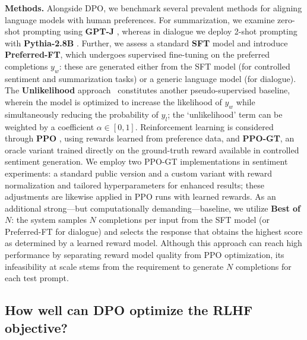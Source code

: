 \textbf{Methods.} Alongside DPO, we benchmark several prevalent methods for aligning language models with human preferences. For summarization, we examine zero-shot prompting using \textbf{GPT-J} \citep{gpt-j}, whereas in dialogue we deploy 2-shot prompting with \textbf{Pythia-2.8B} \citep{biderman2023pythia}. Further, we assess a standard \textbf{SFT} model and introduce \textbf{Preferred-FT}, which undergoes supervised fine-tuning on the preferred completions $y_w$: these are generated either from the SFT model (for controlled sentiment and summarization tasks) or a generic language model (for dialogue). The \textbf{Unlikelihood} approach~\citep{welleck2019neural} constitutes another pseudo-supervised baseline, wherein the model is optimized to increase the likelihood of $y_w$ while simultaneously reducing the probability of $y_l$; the `unlikelihood' term can be weighted by a coefficient $\alpha\in[0,1]$. Reinforcement learning is considered through \textbf{PPO} \citep{schulman2017proximal}, using rewards learned from preference data, and \textbf{PPO-GT}, an oracle variant trained directly on the ground-truth reward available in controlled sentiment generation. We employ two PPO-GT implementations in sentiment experiments: a standard public version \cite{leandro_von_werra_2023_7790115} and a custom variant with reward normalization and tailored hyperparameters for enhanced results; these adjustments are likewise applied in PPO runs with learned rewards. As an additional strong—but computationally demanding—baseline, we utilize \textbf{Best of $N$}: the system samples $N$ completions per input from the SFT model (or Preferred-FT for dialogue) and selects the response that obtains the highest score as determined by a learned reward model. Although this approach can reach high performance by separating reward model quality from PPO optimization, its infeasibility at scale stems from the requirement to generate $N$ completions for each test prompt.

\subsection{How well can DPO optimize the RLHF objective?}

